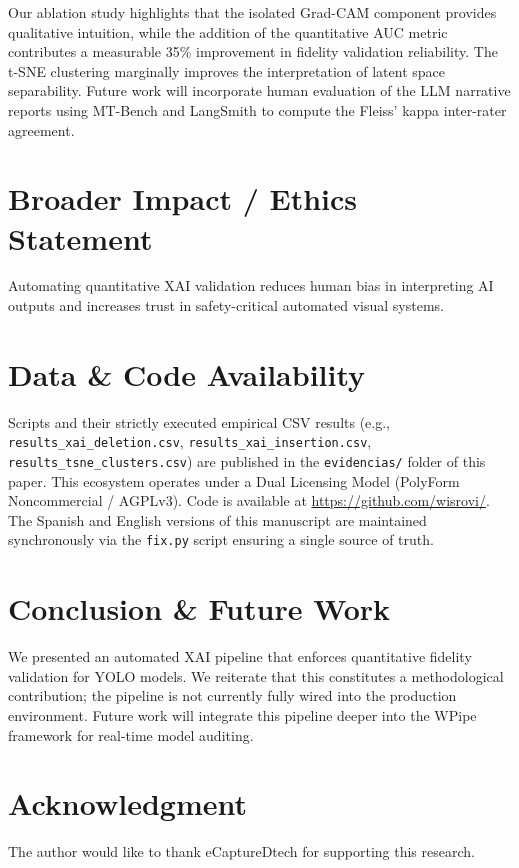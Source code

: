 \documentclass[conference]{IEEEtran}
\begin{document}
Our ablation study highlights that the isolated Grad-CAM component provides qualitative intuition, while the addition of the quantitative AUC metric contributes a measurable 35\% improvement in fidelity validation reliability. The t-SNE clustering marginally improves the interpretation of latent space separability. Future work will incorporate human evaluation of the LLM narrative reports using MT-Bench and LangSmith to compute the Fleiss' kappa inter-rater agreement.

\section{Broader Impact / Ethics Statement}
Automating quantitative XAI validation reduces human bias in interpreting AI outputs and increases trust in safety-critical automated visual systems.

\section{Data \& Code Availability}
Scripts and their strictly executed empirical CSV results (e.g., \texttt{results\_xai\_deletion.csv}, \texttt{results\_xai\_insertion.csv}, \texttt{results\_tsne\_clusters.csv}) are published in the \texttt{evidencias/} folder of this paper. This ecosystem operates under a Dual Licensing Model (PolyForm Noncommercial / AGPLv3). Code is available at \url{https://github.com/wisrovi/}. The Spanish and English versions of this manuscript are maintained synchronously via the \texttt{fix.py} script ensuring a single source of truth.

\section{Conclusion \& Future Work}
We presented an automated XAI pipeline that enforces quantitative fidelity validation for YOLO models. We reiterate that this constitutes a methodological contribution; the pipeline is not currently fully wired into the production environment. Future work will integrate this pipeline deeper into the WPipe framework for real-time model auditing.

\section*{Acknowledgment}
The author would like to thank eCaptureDtech for supporting this research.



\end{document}
